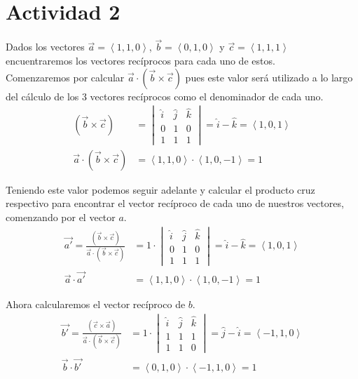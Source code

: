 \documentclass{article}
\newcommand{\custvec}[1]{\left\langle#1\right\rangle}
\begin{document}
\section{Actividad 2}
Dados los vectores $\vec{a}=\custvec{1,1,0}$, $\vec{b}=\custvec{0,1,0}$ y $\vec{c}=\custvec{1,1,1}$ encuentraremos los vectores recíprocos para cada uno de estos.\\

Comenzaremos por calcular $\vec{a}\cdot (\vec{b}\times \vec{c})$ pues este valor será utilizado a lo largo del cálculo de los 3 vectores recíprocos como el denominador de cada uno.\\
\begin{equation*}
    \begin{split}
        (\vec{b}\times \vec{c}) &= \begin{vmatrix}
        \hat{i} & \hat{j} & \hat{k} \\
        0 & 1 & 0 \\
        1 & 1 & 1
        \end{vmatrix} = \hat{i} - \hat{k} = \custvec{1,0,1}\\
        \vec{a}\cdot (\vec{b}\times \vec{c}) &= \custvec{1,1,0} \cdot \custvec{1,0,-1} = 1
    \end{split}
\end{equation*}

Teniendo este valor podemos seguir adelante y calcular el producto cruz respectivo para encontrar el vector recíproco de cada uno de nuestros vectores, comenzando por el vector $a$.\\
\begin{equation*}
    \begin{split}
        \vec{a'} = \frac{(\vec{b}\times \vec{c})}{\vec{a}\cdot (\vec{b}\times \vec{c})} &= 1\cdot \begin{vmatrix}
        \hat{i} & \hat{j} & \hat{k} \\
        0 & 1 & 0 \\
        1 & 1 & 1
        \end{vmatrix} = \hat{i} - \hat{k} = \custvec{1,0,1}\\
        \vec{a}\cdot \vec{a'} &= \custvec{1,1,0}\cdot \custvec{1,0,-1} = 1 
    \end{split}
\end{equation*}

Ahora calcularemos el vector recíproco de $b$.
\begin{equation*}
    \begin{split}
        \vec{b'} = \frac{(\vec{c}\times \vec{a})}{\vec{a}\cdot (\vec{b}\times \vec{c})} &= 1\cdot \begin{vmatrix}
        \hat{i} & \hat{j} & \hat{k} \\
        1 & 1 & 1 \\
        1 & 1 & 0
        \end{vmatrix} = \hat{j} - \hat{i} = \custvec{-1,1,0}\\
        \vec{b}\cdot \vec{b'} &= \custvec{0,1,0}\cdot \custvec{-1,1,0} = 1 
    \end{split}
\end{equation*}
\end{document}
